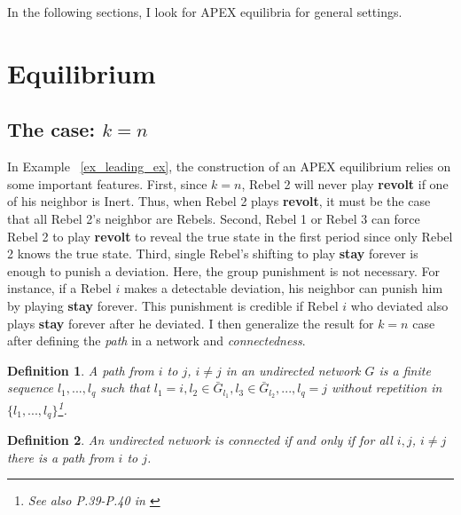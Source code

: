 \documentclass[12pt,letterpaper]{article}
\newtheorem*{main result}{Main Result}
\newtheorem{definition}{Definition}[section]
\theoremstyle{definition}
\theoremstyle{remark}
\theoremstyle{claim}
\begin{document}
In the following sections, I look for APEX equilibria for general settings.

\section{Equilibrium}
\label{sec:equilibrium}
\subsection{The case: $k=n$}

In Example ~\ref{ex_leading_ex}, the construction of an APEX equilibrium relies on some important features. First, since $k=n$, Rebel 2 will never play \textbf{revolt} if one of his neighbor is Inert. Thus, when Rebel 2 plays \textbf{revolt}, it must be the case that all Rebel 2's neighbor are Rebels.  Second, Rebel 1 or Rebel 3 can force Rebel 2 to play \textbf{revolt} to reveal the true state in the first period since only Rebel 2 knows the true state. Third, single Rebel's shifting to play \textbf{stay} forever is enough to punish a deviation. Here, the group punishment is not necessary. For instance, if a Rebel $i$ makes a detectable deviation, his neighbor can punish him by playing \textbf{stay} forever. This punishment is credible if Rebel $i$ who deviated also plays \textbf{stay} forever after he deviated. I then generalize the result for $k=n$ case after defining the \textit{path} in a network and \textit{connectedness}.

\begin{definition}
A path from $i$ to $j$, $i\neq j$ in an undirected network $G$ is a finite sequence $l_1,...,l_q$ such that $l_1=i, l_2\in \bar{G}_{l_1}, l_3\in \bar{G}_{l_2},...,l_q=j$ without repetition in $\{l_1,...,l_q\}$\footnote{See also P.39-P.40 in \citep{gross2005graph}}.  
\end{definition}

\begin{definition}
An undirected network is connected if and only if for all $i,j$, $i\neq j$ there is a path from $i$ to $j$. 
\end{definition}
\end{document}
